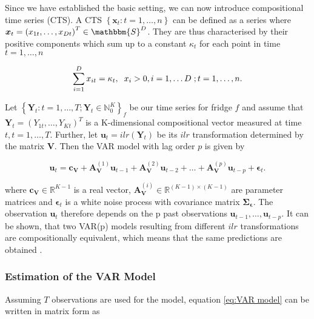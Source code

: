 Since we have established the basic setting, we can now introduce compositional time series (CTS). A CTS $\left\{\bm{x}_t:t=1,\ldots,n \right\}$ can be defined as a series where $\bm{x}_t = \left(x_{1t},\ldots,x_{Dt}\right)^T \in \mathbbm{S}^D$. They are thus characterised by their positive components which sum up to a constant $\kappa_t$ for each point in time $t=1,\ldots,n$ 

\begin{equation}
\sum_{i=1}^D x_{it} = \kappa_t, \hspace{0.2cm} x_i > 0, i=1,\ldots D \hspace{0.1cm}; t=1,\ldots, n. 
\label{eq:CTS characterisation}
\end{equation} 

Let $\left\{\bm{Y}_t:t=1,\ldots,T; \bm{Y}_t \in \mathbb{N}_0^K \right\}_f$ be our time series for fridge $f$ and assume that $\bm{Y}_t=(Y_{1t},\ldots,Y_{Kt})^T$ is a K-dimensional compositional vector measured at time $t, t=1,\ldots,T$. Further, let $\textbf{u}_t = ilr(\bm{Y}_t)$ be its $ilr$ transformation determined by the matrix $\textbf{V}$. Then the VAR model with lag order $p$ is given by \cite{Kynclova:2015}

\begin{equation}
\textbf{u}_t = \textbf{c}_{\textbf{V}} + \textbf{A}_{\textbf{V}}^{(1)}\textbf{u}_{t-1} + \textbf{A}_{\textbf{V}}^{(2)}\textbf{u}_{t-2} + \ldots + \textbf{A}_{\textbf{V}}^{(p)}\textbf{u}_{t-p} + \bm{\epsilon}_{t}.
\label{eq:VAR model}
\end{equation}

where $\textbf{c}_{\textbf{V}} \in \mathbb{R}^{K-1}$ is a real vector, $\textbf{A}_{\textbf{V}}^{(i)} \in \mathbb{R}^{(K-1) \times (K-1)}$ are parameter matrices and $\bm{\epsilon}_t$ is a white noise process with covariance matrix $\bm{\Sigma_\epsilon}$. The observation $\textbf{u}_t$ therefore depends on the p past observations $\textbf{u}_{t-1},\ldots,\textbf{u}_{t-p}$. It can be shown, that two VAR(p) models resulting from different $ilr$ transformations are compositionally equivalent, which means that the same predictions are obtained \cite{Kynclova:2015}. 


\subsubsection{Estimation of the VAR Model}
\label{sec: Estimation of the Var Model}


Assuming $T$ observations are used for the model, equation \ref{eq:VAR model} can be written in matrix form as

